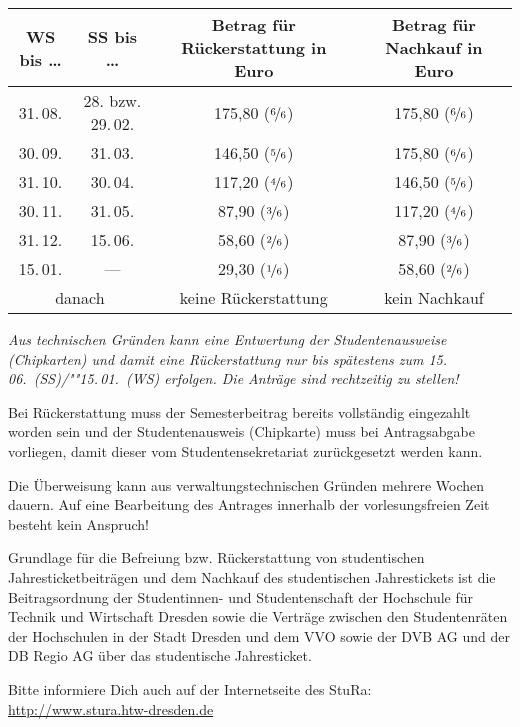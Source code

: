 \documentclass[%
	ngerman,	%
	parskip=half,
	paper=a4,%
	pagesize=auto	%
	]{scrartcl}
\begin{document}
\begin{center}
\begin{tabular}{cccc}
	\toprule
		WS bis \dots
			& SS bis \dots
			& Betrag für Rückerstattung in Euro
			& Betrag für Nachkauf in Euro
			\tabularnewline
	\midrule
			31.\,08.
			& 28. bzw. 29.\,02.
			& 175,80 ($\nicefrac{6}{6}$)
			& 175,80 ($\nicefrac{6}{6}$)
			\tabularnewline
			30.\,09.
			& 31.\,03.
			& 146,50 ($\nicefrac{5}{6}$)
			& 175,80 ($\nicefrac{6}{6}$)
			\tabularnewline
			31.\,10.
			& 30.\,04.
			& 117,20 ($\nicefrac{4}{6}$)
			& 146,50 ($\nicefrac{5}{6}$)
			\tabularnewline
			30.\,11.
			& 31.\,05.
			& 87,90 ($\nicefrac{3}{6}$)
			& 117,20 ($\nicefrac{4}{6}$)
			\tabularnewline
			31.\,12.
			& 15.\,06.
			& 58,60 ($\nicefrac{2}{6}$)
			& 87,90 ($\nicefrac{3}{6}$)
			\tabularnewline
			15.\,01.
			& --- 		
			& 29,30 ($\nicefrac{1}{6}$)
			& 58,60 ($\nicefrac{2}{6}$)
			\tabularnewline
		\multicolumn{2}{c}{danach}
			& keine Rückerstattung
			& kein Nachkauf
			\tabularnewline
	\bottomrule
\end{tabular}
\end{center}

\emph{Aus technischen Gründen kann eine Entwertung der Studentenausweise
(Chipkarten) und damit eine Rückerstattung nur bis spätestens zum
15.\,06.~(SS)/""15.\,01.~(WS) erfolgen. Die Anträge sind rechtzeitig zu stellen!}

Bei Rückerstattung muss der Semesterbeitrag bereits vollständig eingezahlt
worden sein und der Studentenausweis (Chipkarte) muss bei Antragsabgabe
vorliegen, damit dieser vom Studentensekretariat zurückgesetzt werden kann.

Die Überweisung kann aus verwaltungstechnischen Gründen mehrere Wochen
dauern. Auf eine Bearbeitung des Antrages innerhalb der vorlesungsfreien
Zeit besteht kein Anspruch!

Grundlage für die Befreiung bzw. Rückerstattung von studentischen
Jahresticketbeiträgen und dem Nachkauf des studentischen Jahrestickets ist die
Beitragsordnung der Studentinnen- und Studentenschaft der Hochschule für Technik
und Wirtschaft Dresden sowie die Verträge zwischen den Studentenräten der
Hochschulen in der Stadt Dresden und dem VVO sowie der DVB AG und der DB Regio
AG über das studentische Jahresticket.

Bitte informiere Dich auch auf der Internetseite des StuRa:
\url{http://www.stura.htw-dresden.de}
\end{document}
